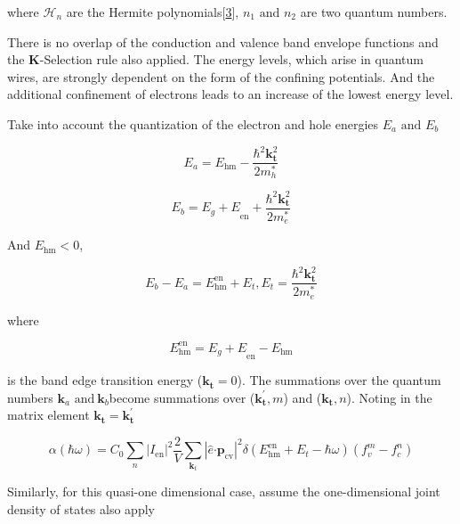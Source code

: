 where \(\mathcal{H}_{n}\) are the Hermite
polynomials{[}\protect\hyperlink{_ENREF_3}{3}{]},
\(n_{1}\text{\ and\ }n_{2}\) are two quantum numbers.

There is no overlap of the conduction and valence band envelope
functions and the \textbf{K}-Selection rule also applied. The energy
levels, which arise in quantum wires, are strongly dependent on the form
of the confining potentials. And the additional confinement of electrons
leads to an increase of the lowest energy level.

Take into account the quantization of the electron and hole energies
\(E_{a}\text{\ and\ }E_{b}\)

\begin{equation}
E_{a} = E_{\text{hm}} - \frac{\hbar^{2}\bm{k}_{\bm{t}}^{2}}{2m_{h}^{*}}
\end{equation}

\begin{equation}
E_{b} = {E_{g} + E}_{\text{en}} + \frac{\hbar^{2}\bm{k}_{\bm{t}}^{2}}{2m_{e}^{*}}
\end{equation}

And \(E_{\text{hm}} < 0\),

\begin{equation}
E_{b} - E_{a} = E_{\text{hm}}^{\text{en}} + E_{t},
E_{t} = \frac{\hbar^{2}\bm{k}_{\bm{t}}^{2}}{2m_{e}^{*}}
\end{equation}

where

\begin{equation}
E_{\text{hm}}^{\text{en}} = {E_{g} + E}_{\text{en}} - E_{\text{hm}}
\end{equation}

is the band edge transition energy (\(\bm{k}_{\bm{t}} = 0\)).
The summations over the quantum numbers
\(\bm{k}_{a}\text{\ and}\bm{\ }\bm{k}_{b}\)become summations
over (\(\bm{k}_{\bm{t}}^{\bm{'}},m\)) and
(\(\bm{k}_{\bm{t}},n\)). Noting in the matrix element
\(\bm{k}_{\bm{t}}\bm{=}\bm{k}_{\bm{t}}^{\bm{'}}\)

\begin{equation}
\alpha\left( \hbar\omega \right) = C_{0}\sum_{n}^{}\left| I_{\text{en}} \right|^{2}\frac{2}{V}\sum_{\bm{k}_{t}}^{}\left| \hat{e}\bm{\cdot}\bm{p}_{\text{cv}} \right|^{2}\delta(E_{\text{hm}}^{\text{en}} + E_{t} - \hbar\omega)(f_{v}^{m} - f_{c}^{n})
\end{equation}

Similarly, for this quasi-one dimensional case, assume the
one-dimensional joint density of states also apply

